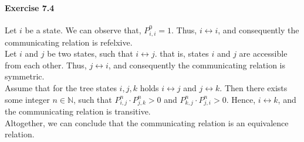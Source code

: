 \paragraph{Exercise 7.4} Let $i$ be a state. We can observe that, $P_{i,i}^0 = 1$.
Thus, $i \leftrightarrow i$, and consequently the communicating relation is
refelxive. \\
Let $i$ and $j$ be two states, such that $i \leftrightarrow j$. that is, states
$i$ and $j$ are accessible from each other. Thus, $j \leftrightarrow i$, and
consequently the communicating relation is symmetric. \\
Assume that for the tree states $i,j,k$ holds $i \leftrightarrow j$ and
$j \leftrightarrow k$. Then there exists some integer $n \in \mathbb{N}$, such
that $P_{i,j}^n\cdot P_{j,k}^n > 0$ and $P_{k,j}^n \cdot P_{j,i}^n > 0$. Hence,
$i \leftrightarrow k$, and the communicating relation is transitive. \\
Altogether, we can conclude that the communicating relation is an equivalence
relation. 
